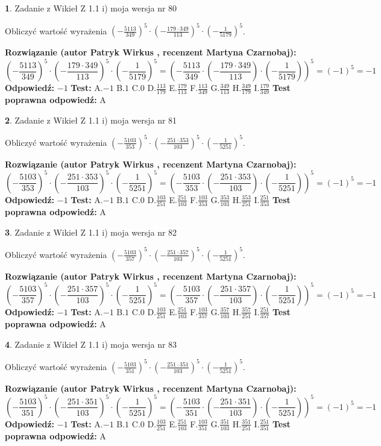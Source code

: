 \documentclass[12pt, a4paper]{article}
\theoremstyle{definition} %
\newtheorem{zad}{}
\newcommand{\zadStart}[1]{\begin{zad}#1\newline}
\newcommand{\zadStop}{\end{zad}}
\newcommand{\rozwStart}[2]{\noindent \textbf{Rozwiązanie (autor #1 , recenzent #2): }\newline}
\newcommand{\rozwStop}{\newline}
\newcommand{\odpStart}{\noindent \textbf{Odpowiedź:}\newline}
\newcommand{\odpStop}{\newline}
\newcommand{\testStart}{\noindent \textbf{Test:}\newline}
\newcommand{\testStop}{\newline}
\newcommand{\kluczStart}{\noindent \textbf{Test poprawna odpowiedź:}\newline}
\newcommand{\kluczStop}{\newline}
\begin{document}
\zadStart{Zadanie z Wikieł Z 1.1 i) moja wersja nr 80}

Obliczyć wartość wyrażenia $(-\frac{5113}{349})^{5} \cdot (-\frac{179 \cdot 349}{113})^{5} \cdot (-\frac{1}{5179})^{5}$.
\zadStop
\rozwStart{Patryk Wirkus}{Martyna Czarnobaj}
$$(-\frac{5113}{349})^{5} \cdot (-\frac{179 \cdot 349}{113})^{5} \cdot (-\frac{1}{5179})^{5} = (-\frac{5113}{349} \cdot (-\frac{179 \cdot 349}{113}) \cdot (-\frac{1}{5179}))^{5} = (-1)^{5} = -1$$
\rozwStop
\odpStart
$-1$
\odpStop
\testStart
A.$-1$ B.$1$ C.$0$ D.$\frac{113}{179}$ E.$\frac{179}{113}$
F.$\frac{113}{349}$ G.$\frac{349}{113}$
H.$\frac{349}{179}$
I.$\frac{179}{349}$
\testStop
\kluczStart
A
\kluczStop



\zadStart{Zadanie z Wikieł Z 1.1 i) moja wersja nr 81}

Obliczyć wartość wyrażenia $(-\frac{5103}{353})^{5} \cdot (-\frac{251 \cdot 353}{103})^{5} \cdot (-\frac{1}{5251})^{5}$.
\zadStop
\rozwStart{Patryk Wirkus}{Martyna Czarnobaj}
$$(-\frac{5103}{353})^{5} \cdot (-\frac{251 \cdot 353}{103})^{5} \cdot (-\frac{1}{5251})^{5} = (-\frac{5103}{353} \cdot (-\frac{251 \cdot 353}{103}) \cdot (-\frac{1}{5251}))^{5} = (-1)^{5} = -1$$
\rozwStop
\odpStart
$-1$
\odpStop
\testStart
A.$-1$ B.$1$ C.$0$ D.$\frac{103}{251}$ E.$\frac{251}{103}$
F.$\frac{103}{353}$ G.$\frac{353}{103}$
H.$\frac{353}{251}$
I.$\frac{251}{353}$
\testStop
\kluczStart
A
\kluczStop



\zadStart{Zadanie z Wikieł Z 1.1 i) moja wersja nr 82}

Obliczyć wartość wyrażenia $(-\frac{5103}{357})^{5} \cdot (-\frac{251 \cdot 357}{103})^{5} \cdot (-\frac{1}{5251})^{5}$.
\zadStop
\rozwStart{Patryk Wirkus}{Martyna Czarnobaj}
$$(-\frac{5103}{357})^{5} \cdot (-\frac{251 \cdot 357}{103})^{5} \cdot (-\frac{1}{5251})^{5} = (-\frac{5103}{357} \cdot (-\frac{251 \cdot 357}{103}) \cdot (-\frac{1}{5251}))^{5} = (-1)^{5} = -1$$
\rozwStop
\odpStart
$-1$
\odpStop
\testStart
A.$-1$ B.$1$ C.$0$ D.$\frac{103}{251}$ E.$\frac{251}{103}$
F.$\frac{103}{357}$ G.$\frac{357}{103}$
H.$\frac{357}{251}$
I.$\frac{251}{357}$
\testStop
\kluczStart
A
\kluczStop



\zadStart{Zadanie z Wikieł Z 1.1 i) moja wersja nr 83}

Obliczyć wartość wyrażenia $(-\frac{5103}{351})^{5} \cdot (-\frac{251 \cdot 351}{103})^{5} \cdot (-\frac{1}{5251})^{5}$.
\zadStop
\rozwStart{Patryk Wirkus}{Martyna Czarnobaj}
$$(-\frac{5103}{351})^{5} \cdot (-\frac{251 \cdot 351}{103})^{5} \cdot (-\frac{1}{5251})^{5} = (-\frac{5103}{351} \cdot (-\frac{251 \cdot 351}{103}) \cdot (-\frac{1}{5251}))^{5} = (-1)^{5} = -1$$
\rozwStop
\odpStart
$-1$
\odpStop
\testStart
A.$-1$ B.$1$ C.$0$ D.$\frac{103}{251}$ E.$\frac{251}{103}$
F.$\frac{103}{351}$ G.$\frac{351}{103}$
H.$\frac{351}{251}$
I.$\frac{251}{351}$
\testStop
\kluczStart
A
\kluczStop
\end{document}
